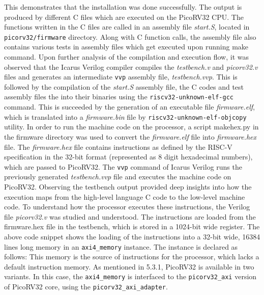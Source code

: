 This demonstrates that the installation was done successfully. The output is produced by different C files which are executed on the PicoRV32 CPU. The functions written in the C files are called in an assembly file \textit{start.S}, located in \verb|picorv32/firmware| directory. Along with C function calls, the assembly file also contains various tests in assembly files which get executed upon running make command. \newline\newline
Upon further analysis of the compilation and execution flow, it was observed that the Icarus Verilog compiler compiles the \textit{testbench.v} and \textit{picorv32.v} files and generates an intermediate \verb|vvp| assembly file, \textit{testbench.vvp}. This is followed by the compilation of the \textit{start.S} assembly file, the C codes and test assembly files the into their binaries using the \verb|riscv32-unknown-elf-gcc| command. This is succeeded by the generation of an executable file \textit{firmware.elf}, which is translated into a \textit{firmware.bin} file by \verb|riscv32-unknown-elf-objcopy| utility. In order to run the machine code on the processor, a script makehex.py in the firmware directory was used to convert the \textit{firmware.elf} file into \textit{firmware.hex} file. The \textit{firmware.hex} file contains instructions as defined by the RISC-V specification in the 32-bit format (represented as 8 digit hexadecimal numbers), which are passed to PicoRV32. The \verb|vvp| command of Icarus Verilog runs the previously generated \textit{testbench.vvp} file and executes the machine code on PicoRV32. \newline\newline
Observing the testbench output provided deep insights into how the execution maps from the high-level language C code to the low-level machine code. To understand how the processor executes these instructions, the Verilog file \textit{picorv32.v} was studied and understood. The instructions are loaded from the firmware.hex file in the testbench, which is stored in a 1024-bit wide register. \newline\newline
The above code snippet shows the loading of the instructions into a 32-bit wide, 16384 lines long memory in an \verb|axi4_memory| instance. The instance is declared as follows: \newline\newline
This memory is the source of instructions for the processor, which lacks a default instruction memory. As mentioned in 5.3.1, PicoRV32 is available in two variants. In this case, the \verb|axi4_memory| is interfaced to the \verb|picorv32_axi| version of PicoRV32 core, using the \verb|picorv32_axi_adapter|.

